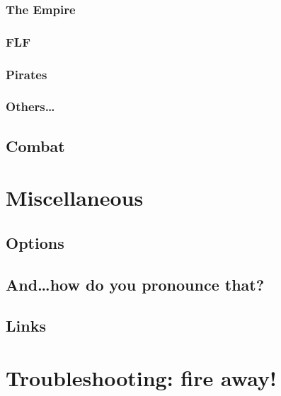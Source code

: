 \documentclass[a4paper,11pt,oneside,notitlepage,openany]{book}
\begin{document}
\subsection{The Empire}
\subsection{FLF}
\subsection{Pirates}
\subsection{Others\ldots}

\section{Combat}



\chapter{Miscellaneous}
\section{Options}
\section{And\ldots how do you pronounce that?}
\section{Links}



\chapter{Troubleshooting: fire away!}
\end{document}
